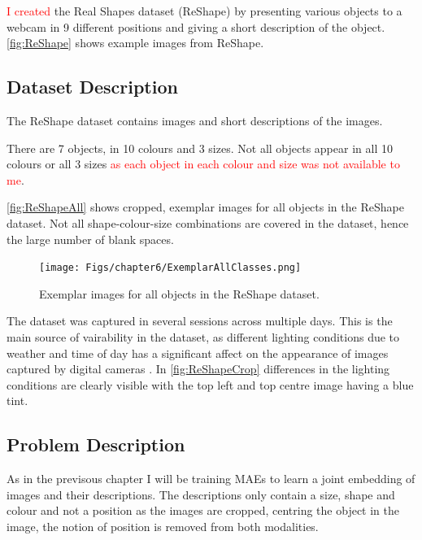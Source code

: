 \textcolor{red}{I created} the Real Shapes dataset (ReShape) by presenting various objects to a webcam in 9 different positions and giving a short description of the object. \autoref{fig:ReShape} shows example images from ReShape.

\subsection{Dataset Description}
The ReShape dataset contains images and short descriptions of the images.

There are 7 objects, in 10 colours and 3 sizes. Not all objects appear in all 10 colours or all 3 sizes \textcolor{red}{as each object in each colour and size was not available to me}.

\autoref{fig:ReShapeAll} shows cropped, exemplar images for all objects in the ReShape dataset. Not all shape-colour-size combinations are covered in the dataset, hence the large number of blank spaces.

\newpage
\begin{figure}[h!]
    \centering
    \texttt{[image: Figs/chapter6/ExemplarAllClasses.png]}
    \caption{Exemplar images for all objects in the ReShape dataset.}
    \label{fig:ReShapeAll}
\end{figure}

The dataset was captured in several sessions across multiple days. This is the main source of vairability in the dataset, as different lighting conditions due to weather and time of day has a significant affect on the appearance of images captured by digital cameras \cite{keller2016analysis, keller}. In \autoref{fig:ReShapeCrop} differences in the lighting conditions are clearly visible with the top left and top centre image having a blue tint.


\subsection{Problem Description}
As in the previsous chapter I will be training \acp{MAE} to learn a joint embedding of images and their descriptions. The descriptions only contain a size, shape and colour and not a position as the images are cropped, centring the object in the image, the notion of position is removed from both modalities.

